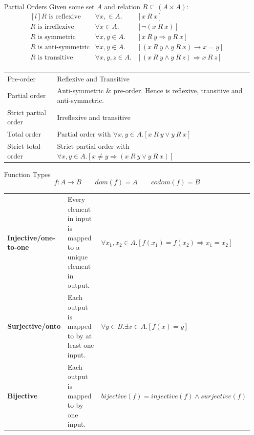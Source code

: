 \begin{definitionbox}{Partial Orders}
	Given some set $A$ and relation $R \subseteq (A \times A)$:
	\[\begin{matrix*}[l]
			R \text{ is reflexive} & \forall x, \in A . & [x \ R \ x] \\
			R \text{ is irreflexive} & \forall x \in A . & [\neg (x \ R \ x)] \\
			R \text{ is symmetric} & \forall x, y \in A . & [x \ R \ y \Rightarrow y \ R \ x] \\
			R \text{ is anti-symmetric} & \forall x, y \in A . & [(x \ R \ y \land y \ R \ x) \rightarrow x = y] \\
			R \text{ is transitive} & \forall x, y, z \in A . & [(x \ R \ y \land y \ R \ z) \Rightarrow x \ R \ z] \\
		\end{matrix*}\]
	\begin{center}
		\begin{tabular}{l l}
			Pre-order            & Reflexive and Transitive                                                                          \\
			Partial order        & Anti-symmetric \& pre-order. Hence is reflexive, transitive and anti-symmetric.                   \\
			Strict partial order & Irreflexive and transitive                                                                        \\
			Total order          & Partial order with $\forall x, y \in A. [x \ R \ y \lor y \ R \ x]$                               \\
			Strict total order   & Strict partial order with $\forall x, y \in A. [x \neq y \Rightarrow (x \ R \ y \lor y \ R \ x)]$ \\
		\end{tabular}
	\end{center}

\end{definitionbox}
\begin{definitionbox}{Function Types}
	\[f: A \to B \qquad dom(f) = A \qquad codom(f) = B\]
	\begin{tabular}{l p{} l}
		\textbf{Injective/one-to-one} & Every element in input is mapped to a unique element in output. & $\forall x_1, x_2 \in A. [f(x_1) = f(x_2) \Rightarrow x_1 = x_2]$ \\
		\textbf{Surjective/onto}      & Each output is mapped to by at least one input.                 & $\forall y \in B. \exists x \in A. [f(x) = y]$                    \\
		\textbf{Bijective}            & Each output is mapped to by one input.                          & $bijective(f) = injective(f) \land surjective(f)$                 \\
	\end{tabular}
\end{definitionbox}
